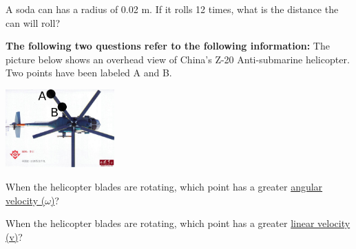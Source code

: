 \documentclass[10pt]{examdesign}
\begin{document}
\begin{multiplechoice} [title={Multiple Choice},
	rearrange=yes]
\begin{question}
	A soda can has a radius of 0.02 m.  If it rolls 12 times, what is the distance the can will roll? 
\end{question}





\begin{block}

		\textbf{The following two questions refer to the following information:} 
		The picture below shows an overhead view of China's Z-20 Anti-submarine helicopter.  Two points have been labeled A and B.  
		
				\includegraphics[height=3cm]{heli.jpg}
	

	
\begin{question}
When the helicopter blades are rotating, which point has a greater \underline{angular velocity ($\omega$)}?
	
	\vspace{0.1in}

\end{question}

\begin{question}
	When the helicopter blades are rotating, which point has a greater \underline{linear velocity (v)}?
	
	\vspace{0.1in}
	
\end{question}



\end{block}
	\end{multiplechoice}
\end{document}
